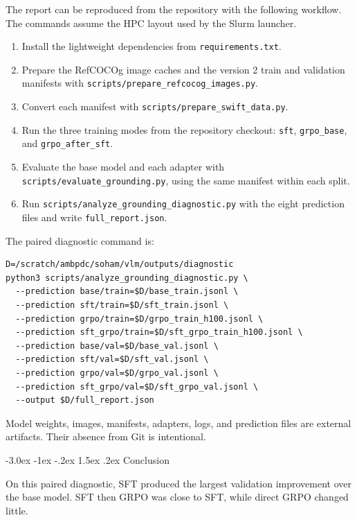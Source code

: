 \documentclass[11pt]{article}
\makeatletter
\renewcommand{\section}{\@startsection{section}{1}{\z@}%
  {-3.0ex \@plus -1ex \@minus -.2ex}%
  {1.5ex \@plus .2ex}%
  {\normalfont\normalsize\bfseries}}
\makeatother
\begin{document}
The report can be reproduced from the repository with the following workflow.
The commands assume the HPC layout used by the Slurm launcher.

\begin{enumerate}
  \item Install the lightweight dependencies from \texttt{requirements.txt}.
  \item Prepare the RefCOCOg image caches and the version 2 train and validation
  manifests with \texttt{scripts/prepare\_refcocog\_images.py}.
  \item Convert each manifest with
  \texttt{scripts/prepare\_swift\_data.py}.
  \item Run the three training modes from the repository checkout:
  \texttt{sft}, \texttt{grpo\_base}, and \texttt{grpo\_after\_sft}.
  \item Evaluate the base model and each adapter with
  \texttt{scripts/evaluate\_grounding.py}, using the same manifest within each
  split.
  \item Run \texttt{scripts/analyze\_grounding\_diagnostic.py} with the eight
  prediction files and write \texttt{full\_report.json}.
\end{enumerate}

The paired diagnostic command is:

\begin{verbatim}
D=/scratch/ambpdc/soham/vlm/outputs/diagnostic
python3 scripts/analyze_grounding_diagnostic.py \
  --prediction base/train=$D/base_train.jsonl \
  --prediction sft/train=$D/sft_train.jsonl \
  --prediction grpo/train=$D/grpo_train_h100.jsonl \
  --prediction sft_grpo/train=$D/sft_grpo_train_h100.jsonl \
  --prediction base/val=$D/base_val.jsonl \
  --prediction sft/val=$D/sft_val.jsonl \
  --prediction grpo/val=$D/grpo_val.jsonl \
  --prediction sft_grpo/val=$D/sft_grpo_val.jsonl \
  --output $D/full_report.json
\end{verbatim}

Model weights, images, manifests, adapters, logs, and prediction files are
external artifacts. Their absence from Git is intentional.

\section{Conclusion}

On this paired diagnostic, SFT produced the largest validation improvement over
the base model. SFT then GRPO was close to SFT, while direct GRPO changed little.
\end{document}
